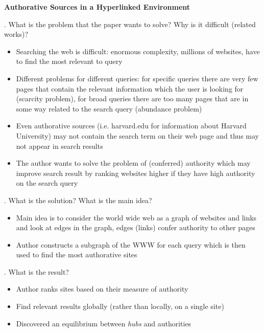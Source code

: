 \documentclass[12pt]{article}
\begin{document}
 

{\Large\centering
    \textbf{Authorative Sources in a Hyperlinked Environment}
\par}

\bigskip

. What is the problem that the paper wants to solve? Why is it difficult (related works)?

\begin{itemize}
    \item Searching the web is difficult: enormous complexity, millions of websites, have to find the most relevant to query
    \item Different problems for different queries: for specific queries there are very few pages that contain the relevant information which the user is looking for (scarcity problem), for broad queries there are too many pages that are in some way related to the search query (abundance problem)
    \item Even authorative sources (i.e. harvard.edu for information about Harvard University) may not contain the search term on their web page and thus may not appear in search results
    \item The author wants to solve the problem of (conferred) authority which may improve search result by ranking websites higher if they have high authority on the search query
\end{itemize}

. What is the solution? What is the main idea?

\begin{itemize}
    \item Main idea is to consider the world wide web as a graph of websites and links and look at edges in the graph, edges (links) confer authority to other pages
    \item Author constructs a subgraph of the WWW for each query which is then used to find the most authorative sites
\end{itemize}

. What is the result?

\begin{itemize}
    \item Author ranks sites based on their measure of authority
    \item Find relevant results globally (rather than locally, on a single site)
    \item Discovered an equilibrium between \emph{hubs} and authorities
\end{itemize}
\end{document}
